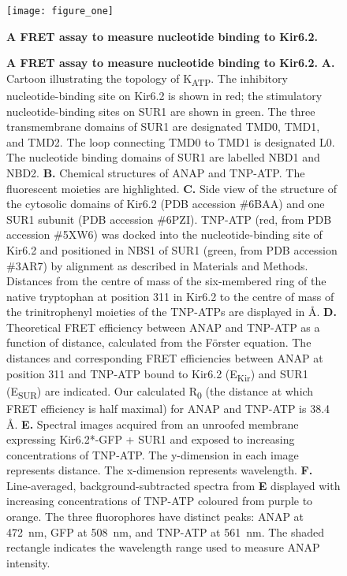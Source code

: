 \documentclass[10pt,lineno, doublespacing]{elife}
\begin{document}
\begin{figure}
\begin{fullwidth}
\centering
\texttt{[image: figure\_one]}
\caption{\textbf{A FRET assay to measure nucleotide binding to Kir6.2.}}
\label{fig:one}
\end{fullwidth}
\end{figure}
\begin{figure}\ContinuedFloat
\begin{fullwidth}
\caption{
\textbf{A FRET assay to measure nucleotide binding to Kir6.2.}
\textbf{A.}
Cartoon illustrating the topology of K\textsubscript{ATP}.
The inhibitory nucleotide-binding site on Kir6.2 is shown in red; the stimulatory nucleotide-binding sites on SUR1 are shown in green.
The three transmembrane domains of SUR1 are designated TMD0, TMD1, and TMD2.
The loop connecting TMD0 to TMD1 is designated L0.
The nucleotide binding domains of SUR1 are labelled NBD1 and NBD2.
\textbf{B.}
Chemical structures of ANAP and TNP-ATP. The fluorescent moieties are highlighted.
\textbf{C.}
Side view of the structure of the cytosolic domains of Kir6.2 (PDB accession \#6BAA) and one SUR1 subunit (PDB accession \#6PZI).
TNP-ATP (red, from PDB accession \#5XW6) was docked into the nucleotide-binding site of Kir6.2 and positioned in NBS1 of SUR1 (green, from PDB accession \#3AR7) by alignment as described in Materials and Methods.
Distances from the centre of mass of the six-membered ring of the native tryptophan at position 311 in Kir6.2 to the centre of mass of the trinitrophenyl moieties of the TNP-ATPs are displayed in \si{\angstrom}.
\textbf{D.}
Theoretical FRET efficiency between ANAP and TNP-ATP as a function of distance, calculated from the Förster equation.
The distances and corresponding FRET efficiencies between ANAP at position 311 and TNP-ATP bound to Kir6.2 (E\textsubscript{Kir}) and SUR1 (E\textsubscript{SUR}) are indicated.
Our calculated R\textsubscript{0} (the distance at which FRET efficiency is half maximal) for ANAP and TNP-ATP is 38.4 \si{\angstrom}.
\textbf{E.}
Spectral images acquired from an unroofed membrane expressing Kir6.2*-GFP + SUR1 and exposed to increasing concentrations of TNP-ATP.
The y-dimension in each image represents distance.
The x-dimension represents wavelength.
\textbf{F.}
Line-averaged, background-subtracted spectra from \textbf{E} displayed with increasing concentrations of TNP-ATP coloured from purple to orange.
The three fluorophores have distinct peaks: ANAP at \SI{472}{\nano\metre}, GFP at \SI{508}{\nano\metre}, and TNP-ATP at \SI{561}{\nano\metre}.
The shaded rectangle indicates the wavelength range used to measure ANAP intensity.
}
\end{fullwidth}
\end{figure}
\end{document}
